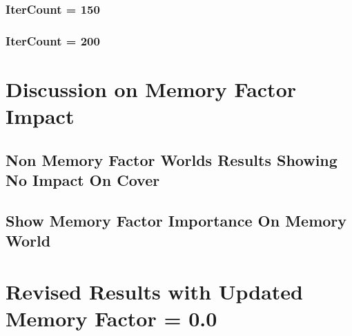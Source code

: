 \subsubsection{IterCount = 150}
\subsubsection{IterCount = 200}

\section{Discussion on Memory Factor Impact}
\subsection{Non Memory Factor Worlds Results Showing No Impact On Cover}
\subsection{Show Memory Factor Importance On Memory World}

\section{Revised Results with Updated Memory Factor = 0.0}







